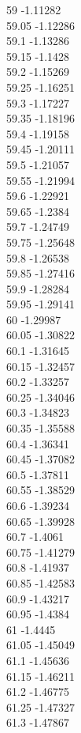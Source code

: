 {59	-1.11282\\
59.05	-1.12286\\
59.1	-1.13286\\
59.15	-1.1428\\
59.2	-1.15269\\
59.25	-1.16251\\
59.3	-1.17227\\
59.35	-1.18196\\
59.4	-1.19158\\
59.45	-1.20111\\
59.5	-1.21057\\
59.55	-1.21994\\
59.6	-1.22921\\
59.65	-1.2384\\
59.7	-1.24749\\
59.75	-1.25648\\
59.8	-1.26538\\
59.85	-1.27416\\
59.9	-1.28284\\
59.95	-1.29141\\
60	-1.29987\\
60.05	-1.30822\\
60.1	-1.31645\\
60.15	-1.32457\\
60.2	-1.33257\\
60.25	-1.34046\\
60.3	-1.34823\\
60.35	-1.35588\\
60.4	-1.36341\\
60.45	-1.37082\\
60.5	-1.37811\\
60.55	-1.38529\\
60.6	-1.39234\\
60.65	-1.39928\\
60.7	-1.4061\\
60.75	-1.41279\\
60.8	-1.41937\\
60.85	-1.42583\\
60.9	-1.43217\\
60.95	-1.4384\\
61	-1.4445\\
61.05	-1.45049\\
61.1	-1.45636\\
61.15	-1.46211\\
61.2	-1.46775\\
61.25	-1.47327\\
61.3	-1.47867\\
}
